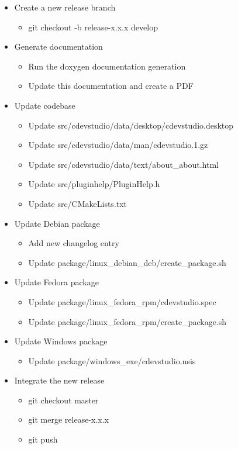 \documentclass{article}
\begin{document}
\begin{itemize}
	\item Create a new release branch
	\begin{itemize}
		\item git checkout -b release-x.x.x develop
	\end{itemize}
	\item Generate documentation
	\begin{itemize}
		\item Run the doxygen documentation generation
		\item Update this documentation and create a PDF
	\end{itemize}
	\item Update codebase
	\begin{itemize}
		\item Update src/cdevstudio/data/desktop/cdevstudio.desktop
		\item Update src/cdevstudio/data/man/cdevstudio.1.gz
		\item Update src/cdevstudio/data/text/about_about.html
		\item Update src/pluginhelp/PluginHelp.h
		\item Update src/CMakeLists.txt
	\end{itemize}
	\item Update Debian package
	\begin{itemize}
		\item Add new changelog entry
		\item Update package/linux_debian_deb/create_package.sh
	\end{itemize}
	\item Update Fedora package
	\begin{itemize}
		\item Update package/linux_fedora_rpm/cdevstudio.spec
		\item Update package/linux_fedora_rpm/create_package.sh
	\end{itemize}
	\item Update Windows package
	\begin{itemize}
		\item Update package/windows_exe/cdevstudio.nsis
	\end{itemize}
	\item Integrate the new release
	\begin{itemize}
		\item git checkout master
		\item git merge release-x.x.x
		\item git push

\end{itemize}
\end{itemize}
\end{document}
